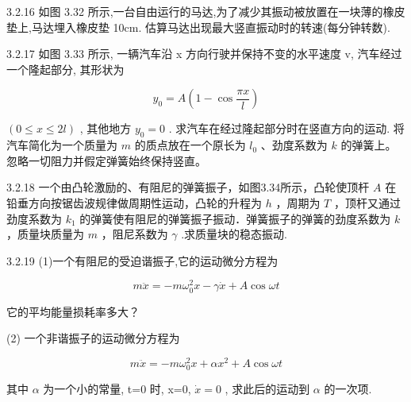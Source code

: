 \begin{problem}{3.2.16}
如图 3.32 所示,一台自由运行的马达,为了减少其振动被放置在一块薄的橡皮垫上,马达埋入橡皮垫 10cm. 估算马达出现最大竖直振动时的转速(每分钟转数).
\begin{center}

\end{center}
\end{problem}
\clearpage


\begin{problem}{3.2.17}
如图 3.33 所示, 一辆汽车沿 x 方向行驶并保持不变的水平速度 v, 汽车经过一个隆起部分, 其形状为

\[
y _ {0} = A \left(1 - \cos \frac {\pi x}{l}\right)
\]

$(0 \leqslant x \leqslant 2l)$ , 其他地方 $y_0 = 0$ . 求汽车在经过隆起部分时在竖直方向的运动. 将汽车简化为一个质量为 $m$ 的质点放在一个原长为 $l_0$ 、劲度系数为 $k$ 的弹簧上。忽略一切阻力并假定弹簧始终保持竖直。
\begin{center}

\end{center}
\end{problem}
\clearpage


\begin{problem}{3.2.18}
一个由凸轮激励的、有阻尼的弹簧振子，如图3.34所示，凸轮使顶杆 $A$ 在铅垂方向按锯齿波规律做周期性运动，凸轮的升程为 $h$ ，周期为 $T$ ，顶杆又通过劲度系数为 $k_{1}$ 的弹簧使有阻尼的弹簧振子振动．弹簧振子的弹簧的劲度系数为 $k$ ，质量块质量为 $m$ ，阻尼系数为 $\gamma$ .求质量块的稳态振动.
\begin{center}

\end{center}
\begin{center}

\end{center}
\end{problem}
\clearpage


\begin{problem}{3.2.19}
(1)一个有阻尼的受迫谐振子,它的运动微分方程为

\[
m \ddot {x} = - m \omega_ {0} ^ {2} x - \gamma \dot {x} + A \cos \omega t
\]

它的平均能量损耗率多大？

(2) 一个非谐振子的运动微分方程为

\[
m \ddot {x} = - m \omega_ {0} ^ {2} x + \alpha x ^ {2} + A \cos \omega t
\]

其中 $\alpha$ 为一个小的常量, t=0 时, x=0, $\dot{x}=0$ , 求此后的运动到 $\alpha$ 的一次项.
\end{problem}
\clearpage


